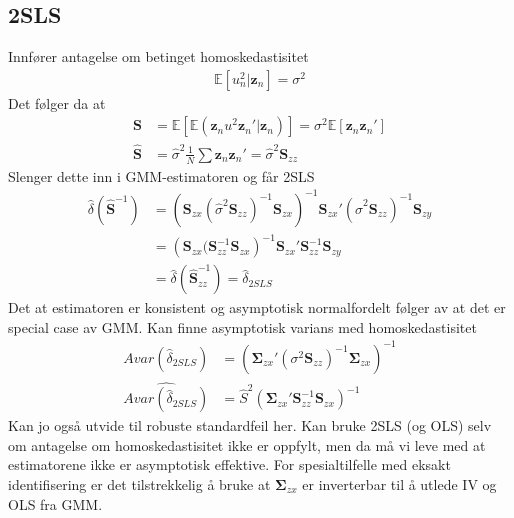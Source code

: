 \subsection{2SLS}
Innfører antagelse om betinget homoskedastisitet
\begin{align}
\mathbb{E}[u_n^2|\mathbf{z}_n]=\sigma^2
\end{align}
Det følger da at
\begin{align}
\mathbf{S} &= \mathbb{E}\left[\mathbb{E}(\mathbf{z}_n u^2\mathbf{z}_n'|\mathbf{z}_n)\right] = \sigma^2\mathbb{E}[\mathbf{z}_n\mathbf{z}_n'] \\
\hat{\mathbf{S}} &= \hat{\sigma}^2\frac{1}{N}\sum \mathbf{z}_n\mathbf{z}_n' =  \hat{\sigma}^2 \mathbf{S}_{zz}
\end{align}
Slenger dette inn i GMM-estimatoren og får 2SLS
\begin{align}
\hat{\delta}(\hat{\mathbf{S}}^{-1}) &= \left( \mathbf{S}_{zx}(\hat{\sigma}^2 \mathbf{S}_{zz})^{-1}\mathbf{S}_{zx}\right)^{-1}\mathbf{S}_{zx}'(\hat{\sigma}^2 \mathbf{S}_{zz})^{-1} \mathbf{S}_{zy} \\
&= \left( \mathbf{S}_{zx}(\mathbf{S}_{zz}^{-1}\mathbf{S}_{zx}\right)^{-1}\mathbf{S}_{zx}'\mathbf{S}_{zz}^{-1} \mathbf{S}_{zy} \\
&= \hat{\delta}(\hat{\mathbf{S}}_{zz}^{-1}) = \hat{\delta}_{2SLS}
\end{align}
Det at estimatoren er konsistent og asymptotisk normalfordelt følger av at det er special case av GMM. Kan finne asymptotisk varians med homoskedastisitet
\begin{align}
Avar(\hat{\delta}_{2SLS}) &=  \left( \mathbf{\Sigma}_{zx}'(\sigma^2 \mathbf{S}_{zz})^{-1} \mathbf{\Sigma}_{zx} \right)^{-1} \\
\widehat{Avar(\hat{\delta}_{2SLS})} &= \hat{S}^2\left(\mathbf{\Sigma}_{zx}'\mathbf{S}_{zz}^{-1} \mathbf{S}_{zx} \right)^{-1}
\end{align}
Kan jo også utvide til robuste standardfeil her. Kan bruke 2SLS (og OLS) selv om antagelse om homoskedastisitet ikke er oppfylt, men da må vi leve med at estimatorene ikke er asymptotisk effektive. For spesialtilfelle med eksakt identifisering er det tilstrekkelig å bruke at $\mathbf{\Sigma}_{zx}$ er inverterbar til å utlede IV og OLS fra GMM.